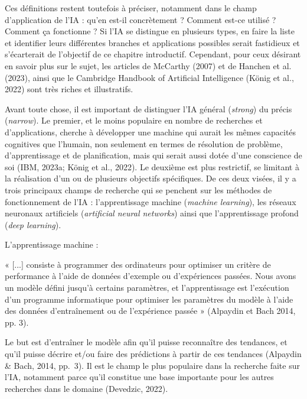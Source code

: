 \documentclass[
  letterpaper,
  DIV=11,
  numbers=noendperiod,
  oneside]{scrreprt}
\begin{document}
Ces définitions restent toutefois à préciser, notamment dans le champ
d'application de l'IA : qu'en est-il concrètement ? Comment est-ce
utilisé ? Comment ça fonctionne ? Si l'IA se distingue en plusieurs
types, en faire la liste et identifier leurs différentes branches et
applications possibles serait fastidieux et s'écarterait de l'objectif
de ce chapitre introductif. Cependant, pour ceux désirant en savoir plus
sur le sujet, les articles de McCarthy (2007) et de Hanchen et al.
(2023), ainsi que le Cambridge Handbook of Artificial Intelligence
(König et al., 2022) sont très riches et illustratifs.

Avant toute chose, il est important de distinguer l'IA général
(\emph{strong}) du précis (\emph{narrow}). Le premier, et le moins
populaire en nombre de recherches et d'applications, cherche à
développer une machine qui aurait les mêmes capacités cognitives que
l'humain, non seulement en termes de résolution de problème,
d'apprentissage et de planification, mais qui serait aussi dotée d'une
conscience de soi (IBM, 2023a; König et al., 2022). Le deuxième est plus
restrictif, se limitant à la réalisation d'un ou de plusieurs objectifs
spécifiques. De ces deux visées, il y a trois principaux champs de
recherche qui se penchent sur les méthodes de fonctionnement de l'IA :
l'apprentissage machine (\emph{machine learning}), les réseaux neuronaux
artificiels (\emph{artificial neural networks}) ainsi que
l'apprentissage profond (\emph{deep learning}).

L'apprentissage machine :

\begin{singlespacing} \begin{displayquote} « [...] consiste à
programmer des ordinateurs pour optimiser un critère de performance
à l'aide de données d'exemple ou d'expériences passées. Nous avons
un modèle défini jusqu'à certains paramètres, et l'apprentissage
est l'exécution d'un programme informatique pour optimiser les
paramètres du modèle à l'aide des données d'entraînement ou de
l'expérience passée » (Alpaydin et Bach 2014, pp. 3).  \end{displayquote}
\end{singlespacing}

Le but est d'entraîner le modèle afin qu'il puisse reconnaître des
tendances, et qu'il puisse décrire et/ou faire des prédictions à partir
de ces tendances (Alpaydin \& Bach, 2014, pp.~3). Il est le champ le
plus populaire dans la recherche faite sur l'IA, notamment parce qu'il
constitue une base importante pour les autres recherches dans le domaine
(Devedzic, 2022).
\end{document}
